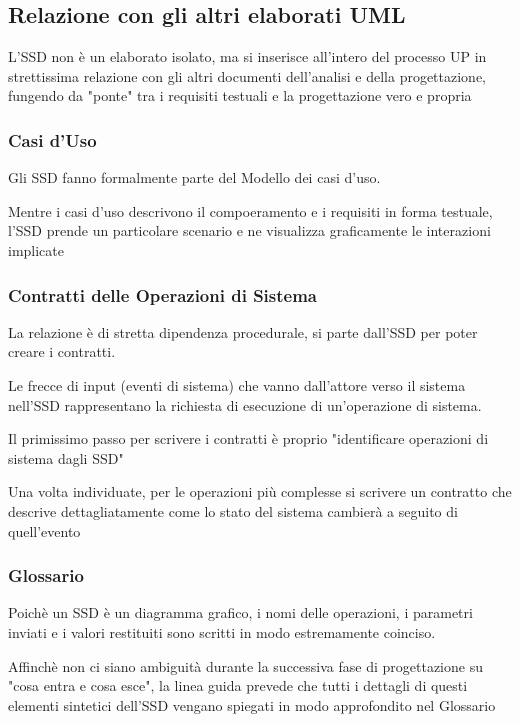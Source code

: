 \subsection{Relazione con gli altri elaborati UML}
L'SSD non è un elaborato isolato, ma si inserisce all'intero del processo UP in strettissima relazione con gli altri documenti dell'analisi e della progettazione, fungendo da "ponte" tra i requisiti testuali e la progettazione vero e propria

\subsubsection{Casi d'Uso}
Gli SSD fanno formalmente parte del Modello dei casi d'uso.

\vspace{\baselineskip}

Mentre i casi d'uso descrivono il compoeramento e i requisiti in forma testuale, l'SSD prende un particolare scenario e ne visualizza graficamente le interazioni implicate

\subsubsection{Contratti delle Operazioni di Sistema}
La relazione è di stretta dipendenza procedurale, si parte dall'SSD per poter creare i contratti.

\vspace{\baselineskip}

Le frecce di input (eventi di sistema) che vanno dall'attore verso il sistema nell'SSD rappresentano la richiesta di esecuzione di un'operazione di sistema.

Il primissimo passo per scrivere i contratti è proprio "identificare operazioni di sistema dagli SSD"

\vspace{\baselineskip}

Una volta individuate, per le operazioni più complesse si scrivere un contratto che descrive dettagliatamente come lo stato del sistema cambierà a seguito di quell'evento

\subsubsection{Glossario}
Poichè un SSD è un diagramma grafico, i nomi delle operazioni, i parametri inviati e i valori restituiti sono scritti in modo estremamente coinciso.

Affinchè non ci siano ambiguità durante la successiva fase di progettazione su "cosa entra e cosa esce", la linea guida prevede che tutti i dettagli di questi elementi sintetici dell'SSD vengano spiegati in modo approfondito nel Glossario

